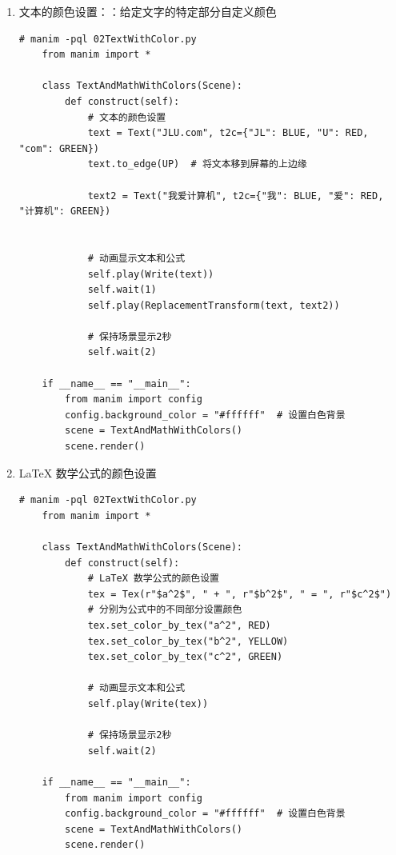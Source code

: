\begin{enumerate}[label=\arabic*)]
    \item 文本的颜色设置：：给定文字的特定部分自定义颜色

    \begin{lstlisting}[style=pythonstyle]
    # manim -pql 02TextWithColor.py
    from manim import *

    class TextAndMathWithColors(Scene):
        def construct(self):
            # 文本的颜色设置
            text = Text("JLU.com", t2c={"JL": BLUE, "U": RED, "com": GREEN})
            text.to_edge(UP)  # 将文本移到屏幕的上边缘
    
            text2 = Text("我爱计算机", t2c={"我": BLUE, "爱": RED, "计算机": GREEN})
    
    
            # 动画显示文本和公式
            self.play(Write(text))
            self.wait(1)
            self.play(ReplacementTransform(text, text2))
    
            # 保持场景显示2秒
            self.wait(2)
    
    if __name__ == "__main__":
        from manim import config
        config.background_color = "#ffffff"  # 设置白色背景
        scene = TextAndMathWithColors()
        scene.render()
    \end{lstlisting}

    \item LaTeX 数学公式的颜色设置 
    \begin{lstlisting}[style=pythonstyle]
    # manim -pql 02TextWithColor.py
    from manim import *

    class TextAndMathWithColors(Scene):
        def construct(self):
            # LaTeX 数学公式的颜色设置
            tex = Tex(r"$a^2$", " + ", r"$b^2$", " = ", r"$c^2$")
            # 分别为公式中的不同部分设置颜色
            tex.set_color_by_tex("a^2", RED)
            tex.set_color_by_tex("b^2", YELLOW)
            tex.set_color_by_tex("c^2", GREEN)
    
            # 动画显示文本和公式
            self.play(Write(tex))
    
            # 保持场景显示2秒
            self.wait(2)
    
    if __name__ == "__main__":
        from manim import config
        config.background_color = "#ffffff"  # 设置白色背景
        scene = TextAndMathWithColors()
        scene.render()
    \end{lstlisting}
\end{enumerate}


